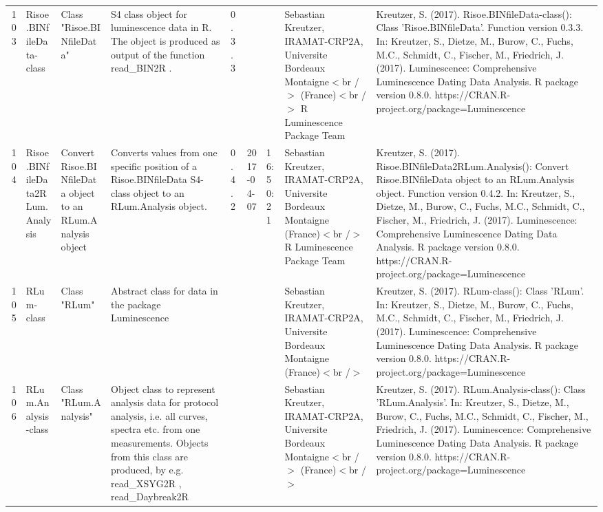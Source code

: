 \begin{table}[ht]
\begin{tabular}{rllllllll}
 \\ 
  103 & Risoe.BINfileData-class & Class  "Risoe.BINfileData" & S4 class object for luminescence data in R. The object is produced as output of the function  read\_BIN2R . & 0.3.3
 &  &  & Sebastian Kreutzer, IRAMAT-CRP2A, Universite Bordeaux Montaigne$<$br /$>$ (France)$<$br /$>$  R Luminescence Package Team & Kreutzer, S. (2017). Risoe.BINfileData-class(): Class 'Risoe.BINfileData'. Function version 0.3.3. In: Kreutzer, S., Dietze, M., Burow, C., Fuchs, M.C., Schmidt, C., Fischer, M., Friedrich, J. (2017). Luminescence: Comprehensive Luminescence Dating Data Analysis. R package version 0.8.0. https://CRAN.R-project.org/package=Luminescence
 \\ 
  104 & Risoe.BINfileData2RLum.Analysis & Convert Risoe.BINfileData object to an RLum.Analysis object & Converts values from one specific position of a Risoe.BINfileData S4-class object to an RLum.Analysis object. & 0.4.2 & 2017-04-07 & 16:50:21
 & Sebastian Kreutzer, IRAMAT-CRP2A, Universite Bordeaux Montaigne (France)$<$br /$>$  R Luminescence Package Team & Kreutzer, S. (2017). Risoe.BINfileData2RLum.Analysis(): Convert Risoe.BINfileData object to an RLum.Analysis object. Function version 0.4.2. In: Kreutzer, S., Dietze, M., Burow, C., Fuchs, M.C., Schmidt, C., Fischer, M., Friedrich, J. (2017). Luminescence: Comprehensive Luminescence Dating Data Analysis. R package version 0.8.0. https://CRAN.R-project.org/package=Luminescence
 \\ 
  105 & RLum-class & Class  "RLum" & Abstract class for data in the package Luminescence &  &  &  & Sebastian Kreutzer, IRAMAT-CRP2A, Universite Bordeaux Montaigne (France)$<$br /$>$ & Kreutzer, S. (2017). RLum-class(): Class 'RLum'. In: Kreutzer, S., Dietze, M., Burow, C., Fuchs, M.C., Schmidt, C., Fischer, M., Friedrich, J. (2017). Luminescence: Comprehensive Luminescence Dating Data Analysis. R package version 0.8.0. https://CRAN.R-project.org/package=Luminescence
 \\ 
  106 & RLum.Analysis-class & Class  "RLum.Analysis" & Object class to represent analysis data for protocol analysis, i.e. all curves, spectra etc. from one measurements. Objects from this class are produced, by e.g.  read\_XSYG2R , read\_Daybreak2R &  &  &  & Sebastian Kreutzer, IRAMAT-CRP2A, Universite Bordeaux Montaigne$<$br /$>$ (France)$<$br /$>$ & Kreutzer, S. (2017). RLum.Analysis-class(): Class 'RLum.Analysis'. In: Kreutzer, S., Dietze, M., Burow, C., Fuchs, M.C., Schmidt, C., Fischer, M., Friedrich, J. (2017). Luminescence: Comprehensive Luminescence Dating Data Analysis. R package version 0.8.0. https://CRAN.R-project.org/package=Luminescence

\end{tabular}
\end{table}
